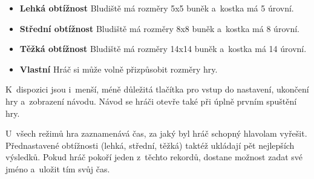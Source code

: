 \begin{itemize}
  \item \textbf{Lehká obtížnost} \poml Bludiště má rozměry 5x5 buněk a~kostka má 5 úrovní.
  \item \textbf{Střední obtížnost} \poml Bludiště má rozměry 8x8 buněk a~kostka má 8 úrovní.
  \item \textbf{Těžká obtížnost} \poml Bludiště má rozměry 14x14 buněk a~kostka má 14 úrovní.
  \item \textbf{Vlastní} \poml Hráč si může volně přizpůsobit rozměry hry.
\end{itemize}

K~dispozici jsou i~menší, méně důležitá tlačítka pro vstup do nastavení, ukončení hry a~zobrazení návodu. Návod se hráči otevře také při úplně prvním spuštění hry.

U~všech režimů hra zaznamenává čas, za jaký byl hráč schopný hlavolam vyřešit. Přednastavené obtížnosti (lehká, střední, těžká) taktéž ukládají pět nejlepších výsledků. Pokud hráč pokoří jeden z~těchto rekordů, dostane možnost zadat své jméno a~uložit tím svůj čas.